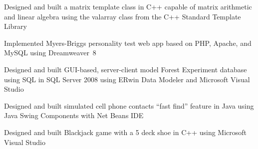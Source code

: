 %
    \begin{itemize*}
        \item Designed and built a matrix template class in C++ capable of matrix arithmetic and linear algebra using the
                valarray class from the C++ Standard Template Library
        \item Implemented Myers-Briggs personality test web app based on PHP, Apache, and MySQL using Dreamweaver~8
        \item Designed and built GUI-based, server-client model Forest Experiment database using SQL in SQL Server 2008
                using ERwin Data Modeler and Microsoft Visual Studio
        \item Designed and built simulated cell phone contacts ``fast find'' feature in Java using Java Swing Components
                with Net Beans IDE
        \item Designed and built Blackjack game with a 5 deck shoe in C++ using Microsoft Visual Studio
    \end{itemize*}
